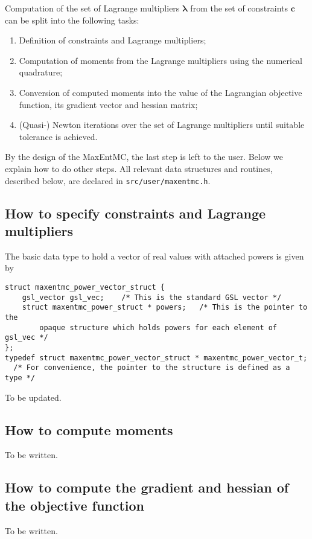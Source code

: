 \documentclass[12pt]{amsart}
\numberwithin{equation}{section}
\newcommand\BS{\boldsymbol}
\begin{document}
Computation of the set of Lagrange multipliers $\BS\lambda$ from the
set of constraints $\BS c$ can be split into the following tasks:
%
\begin{enumerate}
\item Definition of constraints and Lagrange multipliers;
\item Computation of moments from the Lagrange multipliers using the
  numerical quadrature;
\item Conversion of computed moments into the value of the Lagrangian
  objective function, its gradient vector and hessian matrix;
\item (Quasi-) Newton iterations over the set of Lagrange multipliers
  until suitable tolerance is achieved.
\end{enumerate}
%
By the design of the MaxEntMC, the last step is left to the
user. Below we explain how to do other steps. All relevant data
structures and routines, described below, are declared in
\texttt{src/user/maxentmc.h}.

\subsection{How to specify constraints and Lagrange multipliers}
\label{sec:constraints}

The basic data type to hold a vector of real values with attached
powers is given by
%
\begin{verbatim}
struct maxentmc_power_vector_struct {
    gsl_vector gsl_vec;    /* This is the standard GSL vector */
    struct maxentmc_power_struct * powers;   /* This is the pointer to the
        opaque structure which holds powers for each element of gsl_vec */
};
typedef struct maxentmc_power_vector_struct * maxentmc_power_vector_t;
  /* For convenience, the pointer to the structure is defined as a type */
\end{verbatim}

To be updated.

\subsection{How to compute moments}
\label{sec:quadrature}

To be written.

\subsection{How to compute the gradient and hessian of the objective function}
\label{sec:grad_hess}

To be written.
\end{document}
